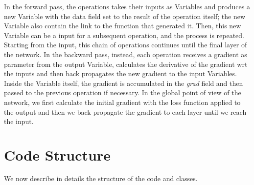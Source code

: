 \documentclass[10pt,conference,compsocconf]{IEEEtran}
\begin{document}
	In the forward pass, the operations takes their inputs as Variables and produces a new Variable with the data field set to the result of the operation itself; the new Variable also contain the link to the function that generated it. Then, this new Variable can be a input for a subsequent operation, and the process is repeated.  Starting from the input, this chain of operations continues until the final layer of the network. 
	In the backward pass, instead, each operation receives a gradient as parameter from the output Variable, calculates the derivative of the gradient wrt the inputs and then back propagates the new gradient to the input Variables. Inside the Variable itself, the gradient is accumulated in the \textit{grad} field and then passed to the previous operation if necessary. In the global point of view of the network, we first calculate the initial gradient with the loss function applied to the output and then we back propagate the gradient to each layer until we reach the input.
        
        
\section{Code Structure}
We now describe in details the structure of the code and classes.
\end{document}
